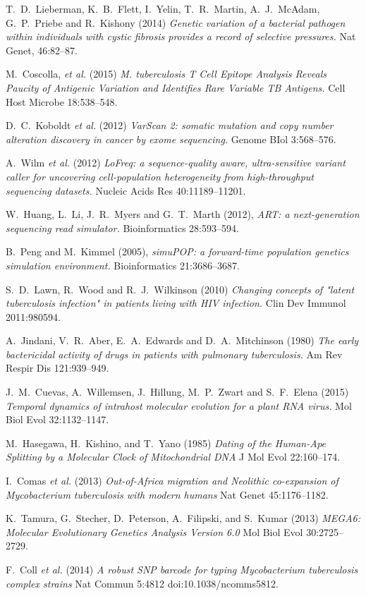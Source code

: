 \documentclass[12pt, oneside]{article}   	%
\begin{document}
\begin{thebibliography}{10}
T.~D.~Lieberman, K.~B.~Flett, I.~Yelin, T.~R.~Martin, A.~J.~McAdam, G.~P.~Priebe and R.~Kishony (2014) {\em {G}enetic variation of a bacterial pathogen within individuals with cystic fibrosis provides a record of selective pressures.} Nat Genet, 46:82--87.

M.~Coscolla, {\em et al.} (2015) {\em{M}. tuberculosis {T} {C}ell {E}pitope {A}nalysis {R}eveals {P}aucity of {A}ntigenic {V}ariation and {I}dentifies {R}are {V}ariable {T}{B} {A}ntigens.} Cell Host Microbe 18:538--548.

D.~C.~Koboldt {\em et al.} (2012) {\em {V}ar{S}can 2: somatic mutation and copy number alteration discovery in cancer by exome sequencing.} Genome BIol 3:568--576.

A.~Wilm {\em et al.} (2012) {\em {L}o{F}req: a sequence-quality aware, ultra-sensitive variant caller for uncovering cell-population heterogeneity from high-throughput sequencing datasets.} Nucleic Acids Res 40:11189--11201.

W.~Huang, L.~Li, J.~R.~Myers and G.~T.~Marth (2012), {\em {A}{R}{T}: a next-generation sequencing read simulator.} Bioinformatics 28:593--594.

B.~Peng and M.~Kimmel (2005), {\em simu{P}{O}{P}: a forward-time population genetics simulation environment.} Bioinformatics 21:3686--3687.

 S.~D.~Lawn, R.~Wood  and R.~J.~Wilkinson (2010) {\em{C}hanging concepts of "latent tuberculosis infection" in patients living with {H}{I}{V} infection.} Clin Dev Immunol 2011:980594.

A.~Jindani, V.~R.~Aber, E.~A.~Edwards and D.~A.~Mitchinson (1980) {\em {T}he early bactericidal activity of drugs in patients with pulmonary tuberculosis.} Am Rev Respir Dis 121:939--949.

J.~M.~Cuevas, A.~Willemsen, J.~Hillung, M.~P.~Zwart and S.~F.~Elena (2015) {\em{T}emporal dynamics of intrahost molecular evolution for a plant {R}{N}{A} virus.} Mol Biol Evol 32:1132--1147.

M.~Hasegawa, H.~Kishino, and T.~Yano (1985) {\em {D}ating of the {H}uman-{A}pe {S}plitting by a {M}olecular {C}lock of {M}itochondrial {D}{N}{A}} J Mol Evol 22:160--174.

I.~Comas {\em et al.}  (2013) {\em {O}ut-of-{A}frica migration and {N}eolithic co-expansion of {M}ycobacterium tuberculosis with modern humans} Nat Genet 45:1176--1182.

K.~Tamura, G.~Stecher, D.~Peterson, A.~Filipski, and S.~Kumar (2013) {\em {M}{E}{G}{A}6: {M}olecular {E}volutionary {G}enetics {A}nalysis {V}ersion 6.0} Mol Biol Evol 30:2725--2729.

F.~Coll {\em et al.}  (2014) {\em {A} robust {S}{N}{P} barcode for typing {M}ycobacterium tuberculosis complex strains} Nat Commun 5:4812 doi:10.1038/ncomms5812.

\end{thebibliography}

%
%
\end{document}
